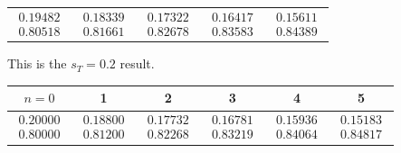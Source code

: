 \begin{exercises}
\begin{answer}
\begin{exparts}
\begin{center}
\begin{tabular}{|ccccc}
               \hline
               $\begin{array}{c}  0.19482 \\ 0.80518 \end{array}$
               &$\begin{array}{c}  0.18339 \\ 0.81661 \end{array}$
               &$\begin{array}{c}  0.17322 \\ 0.82678 \end{array}$
               &$\begin{array}{c}  0.16417 \\ 0.83583 \end{array}$
               &$\begin{array}{c}  0.15611 \\ 0.84389 \end{array}$
             \end{tabular}
           \end{center}
         \partsitem This is the $s_T=0.2$ result.
           \begin{center}
             \begin{tabular}{c|ccccc}
               $n=0$ &1  &2  &3  &4  &5  \\ 
               \hline
               $\begin{array}{c}  0.20000 \\ 0.80000 \end{array}$
               &$\begin{array}{c}   0.18800 \\ 0.81200 \end{array}$
               &$\begin{array}{c}   0.17732 \\ 0.82268 \end{array}$
               &$\begin{array}{c}   0.16781 \\ 0.83219 \end{array}$
               &$\begin{array}{c}   0.15936 \\ 0.84064 \end{array}$
               &$\begin{array}{c}   0.15183 \\ 0.84817 \end{array}$
             \end{tabular}                                         \\[1ex]

\end{center}
\end{exparts}
\end{answer}
\end{exercises}
